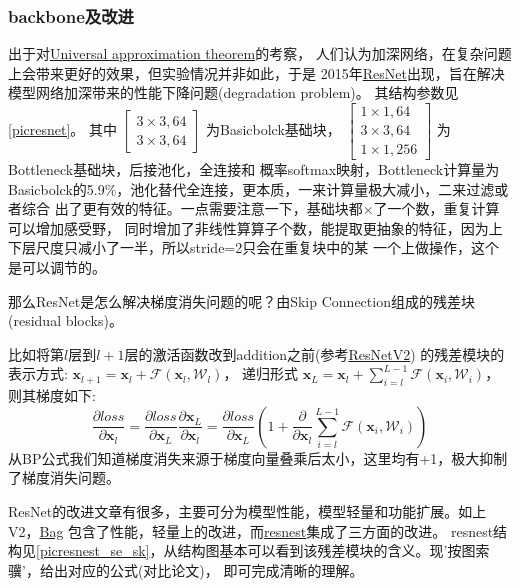 \documentclass[UTF8]{ctexart}
\begin{document}
\subsubsection{backbone及改进}

出于对\href{https://en.wikipedia.org/wiki/Universal_approximation_theorem}{Universal approximation theorem}的考察，
人们认为加深网络，在复杂问题上会带来更好的效果，但实验情况并非如此，于是
2015年\href{https://arxiv.org/abs/1512.03385}{ResNet}出现，旨在解决模型网络加深带来的性能下降问题(degradation problem)。
其结构参数见\ref{picresnet}。
其中
$
\left[\begin{array}{l}
	3 \times 3,64 \\
	3 \times 3,64
\end{array}\right] 
$
为Basicbolck基础块，
$
\left[\begin{array}{c}
	1 \times 1,64 \\
	3 \times 3,64 \\
	1 \times 1,256
\end{array}\right] 
$
为Bottleneck基础块，后接池化，全连接和
概率softmax映射，Bottleneck计算量为Basicbolck的5.9\%，池化替代全连接，更本质，一来计算量极大减小，二来过滤或者综合
出了更有效的特征。一点需要注意一下，基础块都$\times$了一个数，重复计算可以增加感受野，
同时增加了非线性算算子个数，能提取更抽象的特征，因为上下层尺度只减小了一半，所以stride=2只会在重复块中的某
一个上做操作，这个是可以调节的。

那么ResNet是怎么解决梯度消失问题的呢？由Skip Connection组成的残差块(residual blocks)。

比如将第$l$层到$l+1$层的激活函数改到addition之前(参考\href{https://arxiv.org/abs/1603.05027}{ResNetV2})
的残差模块的表示方式:
$
\mathbf{x}_{l+1}=\mathbf{x}_{l}+\mathcal{F}\left(\mathbf{x}_{l}, \mathcal{W}_{l}\right)
$，
递归形式
$
\mathbf{x}_{L}=\mathbf{x}_{l}+\sum_{i=l}^{L-1} \mathcal{F}\left(\mathbf{x}_{i}, \mathcal{W}_{i}\right)
$，
则其梯度如下:
$$
\frac{\partial loss}{\partial \mathbf{x}_{l}}=\frac{\partial loss}{\partial \mathbf{x}_{L}}
 \frac{\partial \mathbf{x}_{L}}{\partial \mathbf{x}_{l}}=\frac{\partial loss}{\partial 
 \mathbf{x}_{L}}\left(1+\frac{\partial}{\partial \mathbf{x}_{l}} \sum_{i=l}^{L-1} 
 \mathcal{F}\left(\mathbf{x}_{i}, \mathcal{W}_{i}\right)\right)
$$
从BP公式我们知道梯度消失来源于梯度向量叠乘后太小，这里均有+1，极大抑制了梯度消失问题。

ResNet的改进文章有很多，主要可分为模型性能，模型轻量和功能扩展。如上V2，\href{https://arxiv.org/pdf/1812.01187.pdf}{Bag}
包含了性能，轻量上的改进，而\href{https://hangzhang.org/files/resnest.pdf}{resnest}集成了三方面的改进。
resnest结构见\ref{picresnest_se_sk}，从结构图基本可以看到该残差模块的含义。现'按图索骥'，给出对应的公式(对比论文)，
即可完成清晰的理解。
\end{document}
